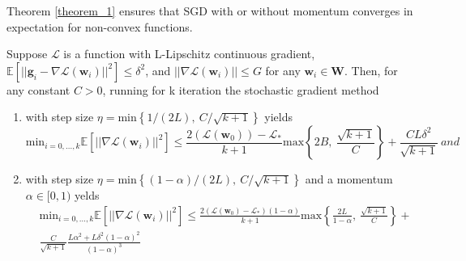 			Theorem \ref{theorem_1} ensures that SGD with or without momentum converges in expectation for non-convex functions.

			\begin{theorem}
				Suppose $\mathcal{L}$ is a function with L-Lipschitz continuous gradient,
				$\mathbb{E} \left [ || \mathbf{g}_{i} - \nabla \mathcal{L}(\textbf{w}_{i}) ||^2 \right ] \le \delta^2$, and
				$|| \nabla \mathcal{L}(\textbf{w}_{i}) || \le G$ for any $\textbf{w}_{i} \in \textbf{W}$. Then, for any constant
				$C > 0$, running for k iteration the stochastic gradient method

				\begin{enumerate}
					\item with step size $\eta = \text{min} \left \{ 1\slash(2L),\ C\slash\sqrt{k + 1} \right \}$
					yields
					\begin{equation*}
					    \text{min}_{i = 0, \ldots, k} \mathbb{E} \left [ || \nabla \mathcal{L}(\textbf{w}_i) ||^2 \right ]
					    \le \frac{2(\mathcal{L}(\textbf{w}_{0})) - \mathcal{L}_{*}}{k + 1} \text{max} \left\{ 2B,\
					    \frac{\sqrt{k + 1}}{C} \right\} + \frac{CL\delta^2}{\sqrt{k + 1}} \ and
					\end{equation*}
					\item with step size $\eta = \text{min} \left \{ (1 - \alpha)\slash(2L),\
					C\slash\sqrt{k + 1} \right \}$ and a momentum $\alpha \in [0, 1)$ yelds
					\begin{align*}
						&\text{min}_{i = 0, \ldots, k} \mathbb{E} \left [ || \nabla \mathcal{L}(\textbf{w}_{i}) ||^2 \right ]
						\le \frac{2(\mathcal{L}(\textbf{w}_{0}) - \mathcal{L}_{*})(1 - \alpha)}{k + 1}
						\text{max} \left\{ \frac{2L}{1 - \alpha},\ \frac{\sqrt{k + 1}}{C} \right\} + \\
						&\frac{C}{\sqrt{k + 1}}\frac{L\alpha^2 + L\delta^2(1 - \alpha)^2}{(1 - \alpha)^3}
					\end{align*}
				\end{enumerate}
				\label{theorem_1}
			\end{theorem}

